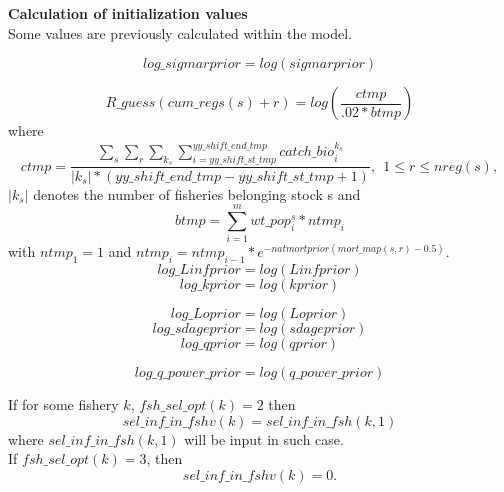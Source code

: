 \documentclass{article}
\begin{document}
\textbf{Calculation of initialization values}\\
Some values are previously calculated within the model.

\begin{equation}
log\_sigmarprior = log(sigmarprior)
\end{equation}

\begin{equation} R\_guess(cum\_regs(s)+r) = log\left(\dfrac{ctmp}{.02*btmp}\right)
\end{equation}
where 
\begin{equation*}
    ctmp = \dfrac{\sum_s\sum_r\sum_{k_s}\sum_{i=yy\_shift\_st\_tmp}^{yy\_shift\_end\_tmp} catch\_bio_i^{k_s}}{|k_s|*(yy\_shift\_end\_tmp - yy\_shift\_st\_tmp + 1)}, \ \  1\leq r \leq nreg(s),
\end{equation*}
$|k_s|$ denotes the number of fisheries belonging stock s and
\begin{equation*}
    btmp =\sum_{i=1}^m wt\_pop^s_i*ntmp_i
\end{equation*}
with $ntmp_1=1$ and 
$ntmp_i=ntmp_{i-1}*e^{-natmortprior(mort\_map(s,r)-0.5)}.$
\begin{equation}
log\_Linfprior = log(Linfprior)
\end{equation}
\begin{equation}
    log\_kprior = log(kprior)
\end{equation}

\begin{equation}
    log\_Loprior = log(Loprior)
\end{equation}
\begin{equation}
    log\_sdageprior = log(sdageprior)
\end{equation}
\begin{equation}
    log\_qprior = log(qprior)
\end{equation}

\begin{equation}
    log\_q\_power\_prior = log(q\_power\_prior)
\end{equation}

If for some fishery $k$, $fsh\_sel\_opt(k)=2$ then
\begin{equation}
    sel\_inf\_in\_fshv(k)=sel\_inf\_in\_fsh(k,1) 
\end{equation}
where $sel\_inf\_in\_fsh(k,1) $ will be input in such case.\\
If $fsh\_sel\_opt(k)=3$, then 
\begin{equation}
    sel\_inf\_in\_fshv(k)=0.
\end{equation}
\end{document}
